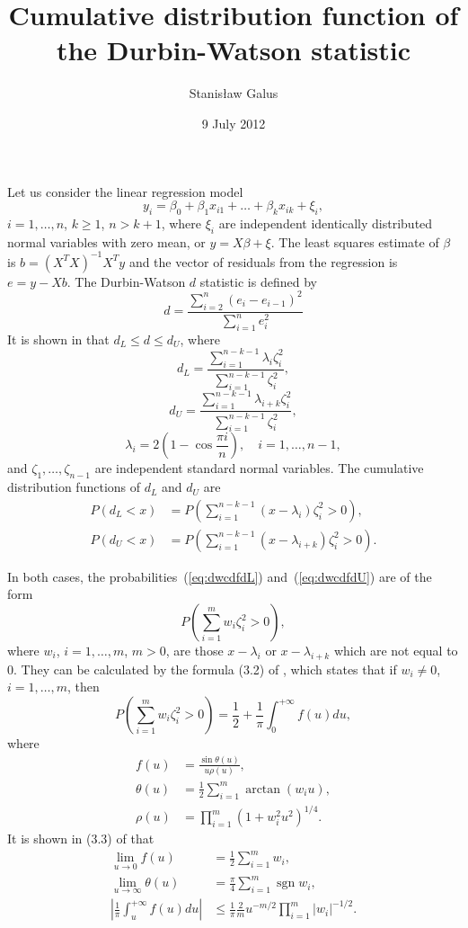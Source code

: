 \documentclass[a4paper,11pt]{article}
\title{Cumulative distribution function of the Durbin-Watson statistic}
\author{Stanis{\l}aw Galus}
\date{9 July 2012}
\DeclareMathOperator*{\sgn}{sgn}
\renewcommand{\Pr}{\mathit{P}}
\begin{document}
\maketitle

Let us consider the linear regression model \[ y_i = \beta_0 +
\beta_1x_{i1} + \ldots + \beta_kx_{ik} + \xi_i, \] $i = 1, \ldots, n$,
$k \geq 1$, $n > k + 1$, where $\xi_i$ are independent identically
distributed normal variables with zero mean, or $y = X\beta + \xi$. The
least squares estimate of $\beta$ is $b = (X^TX)^{-1}X^Ty$ and the
vector of residuals from the regression is $e = y - Xb$. The
Durbin-Watson $d$ statistic is defined by \[ d = \frac{\sum_{i = 2}^n
  (e_i - e_{i - 1})^2}{\sum_{i = 1}^n e_i^2} \] It is shown in
\cite[p.~426]{durbin-watson-1950} that $d_L \leq d \leq d_U$, where \[
d_L = \frac{\sum_{i = 1}^{n - k - 1} \lambda_i \zeta_i^2} {\sum_{i =
    1}^{n - k - 1} \zeta_i^2}, \] \[ d_U = \frac{\sum_{i = 1}^{n - k -
    1} \lambda_{i + k} \zeta_i^2} {\sum_{i = 1}^{n - k - 1}
  \zeta_i^2}, \] \[ \lambda_i = 2\left(1 - \cos \frac{\pi i}{n}\right),
\quad i = 1, \ldots, n - 1, \] and $\zeta_1, \ldots, \zeta_{n - 1}$ are
independent standard normal variables. The cumulative distribution
functions of $d_L$ and $d_U$ are
\begin{align} \label{eq:dwcdfdL}
  \Pr(d_L < x) &= \Pr\left(\sum_{i = 1}^{n - k - 1} (x - \lambda_i)
  \zeta_i^2 > 0 \right), \\
  \label{eq:dwcdfdU}
  \Pr(d_U < x) &= \Pr\left(\sum_{i = 1}^{n - k - 1} (x - \lambda_{i + k})
  \zeta_i^2 > 0 \right).
\end{align}

In both cases, the probabilities~(\ref{eq:dwcdfdL})
and~(\ref{eq:dwcdfdU}) are of the form \[ \Pr\left(\sum_{i = 1}^m w_i
\zeta_i^2 > 0 \right), \] where $w_i$, $i = 1, \ldots, m$, $m > 0$, are
those $x - \lambda_i$ or $x - \lambda_{i + k}$ which are not equal to 0.
They can be calculated by the formula (3.2) of
\cite[p.~422]{imhof-1961}, which states that if $w_i \neq 0$, $i = 1,
\ldots, m$, then \[ \Pr\left(\sum_{i = 1}^m w_i \zeta_i^2 > 0 \right) =
\frac{1}{2} + \frac{1}{\pi} \int_0^{+\infty} f(u) du, \] where
\begin{align*}
  f(u) &= \frac{\sin \theta(u)}{u \rho(u)}, \\
  \theta(u) &= \frac{1}{2} \sum_{i = 1}^m \arctan(w_iu), \\
  \rho(u) &= \prod_{i = 1}^m (1 + w_i^2u^2)^{1 / 4}.
\end{align*}
It is shown in (3.3) of \cite[p.~423]{imhof-1961} that
\begin{align}
  \nonumber
  \lim_{u \rightarrow 0} f(u) &= \frac{1}{2} \sum_{i = 1}^m w_i, \\
  \nonumber
  \lim_{u \rightarrow \infty} \theta(u) &= \frac{\pi}{4}
  \sum_{i = 1}^m \sgn w_i, \\
  \label{eq:dwcdftail}
  |\frac{1}{\pi} \int_u^{+\infty} f(u) du| & \leq
  \frac{1}{\pi} \frac{2}{m} u^{-m / 2} \prod_{i = 1}^m |w_i|^{-1 / 2}.
\end{align}
\end{document}
